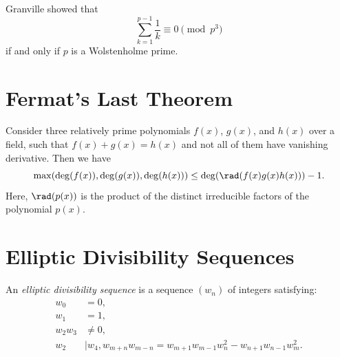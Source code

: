 Granville showed that
\begin{equation*}
  \sum_{k=1}^{p-1}\frac{1}{k}\equiv 0\pmod{p^3}
\end{equation*}
if and only if $p$ is a Wolstenholme prime.

\section{Fermat's Last Theorem}

\begin{theorem}
  Consider three relatively prime polynomials $f(x)$, $g(x)$, and $h(x)$ over a field, such that $f(x)+g(x)=h(x)$ and not all of them have vanishing derivative. Then we have
  \begin{equation*}
    \max(\deg(f(x)),\deg(g(x)),\deg(h(x))) \leq \deg(\rad(f(x)g(x)h(x)))-1.
  \end{equation*}
  Here, $\rad(p(x))$ is the product of the distinct irreducible factors of the polynomial $p(x)$. 
\end{theorem}

\section{Elliptic Divisibility Sequences}

\begin{definition}
  An \emph{elliptic divisibility sequence} is a sequence $(w_n)$ of integers satisfying:
  \begin{align*}
    w_0 & = 0, \\
    w_1 & = 1, \\
    w_2w_3 & \neq 0, \\
    w_2 & \mid w_4,
    w_{m+n}w_{m-n}=w_{m+1}w_{m-1}w_n^2 - w_{n+1}w_{n-1}w_m^2.
  \end{align*}
\end{definition}

